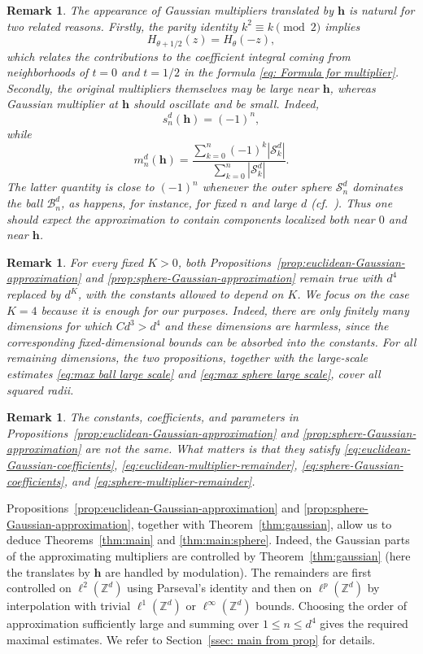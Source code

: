 \documentclass{article}
\newcommand{\Z}{\mathbb Z}
\theoremstyle{plain}
\newtheorem{remark}[theorem]{Remark}
\numberwithin{equation}{section}
\begin{document}
\begin{remark}
   The appearance of Gaussian multipliers translated by
$\mathbf h$
is natural for two related reasons. Firstly, the parity identity $k^2\equiv k \pmod 2$
implies
\[
H_{\theta+1/2}(z)=H_\theta(-z),
\]
which relates the contributions to the coefficient integral coming from
neighborhoods of $t=0$ and $t=1/2$ in the formula \eqref{eq: Formula for multiplier}.
Secondly, the original multipliers themselves may be large near $\mathbf h$, whereas Gaussian multiplier at $\mathbf h$ should oscillate and be small.
Indeed,
\[
s_n^d(\mathbf h)=(-1)^n,
\]
while
\[
m_n^d(\mathbf h)
=
\frac{\displaystyle\sum_{k=0}^n(-1)^k|\mathcal S_k^d|}
{\displaystyle\sum_{k=0}^n|\mathcal S_k^d|}.
\]
The latter quantity is close to $(-1)^n$ whenever the outer sphere
$\mathcal S_n^d$ dominates the ball $\mathcal B_n^d$, as happens, for
instance, for fixed $n$ and large $d$ (cf.\ \cite{NiksinskiWrobel}). Thus one should expect the
approximation to contain components localized both near $0$ and near
$\mathbf h$. 
\end{remark}
\begin{remark}
For every fixed $K>0$, both Propositions~\ref{prop:euclidean-Gaussian-approximation} and \ref{prop:sphere-Gaussian-approximation} remain true with $d^4$ replaced by $d^K$, with the constants allowed to depend on $K$. We focus on the case $K=4$ because it is enough for our purposes. Indeed, there are only finitely many dimensions for which $Cd^3>d^4$ and these dimensions are harmless, since the corresponding fixed-dimensional bounds can be absorbed into the constants. For all remaining dimensions, the two propositions, together with the large-scale estimates \eqref{eq:max ball large scale} and \eqref{eq:max sphere large scale}, cover all squared radii.
\end{remark}
\begin{remark}
The constants, coefficients, and parameters in Propositions~\ref{prop:euclidean-Gaussian-approximation} and \ref{prop:sphere-Gaussian-approximation} are not the same. What matters is that they satisfy \eqref{eq:euclidean-Gaussian-coefficients}, \eqref{eq:euclidean-multiplier-remainder}, \eqref{eq:sphere-Gaussian-coefficients}, and \eqref{eq:sphere-multiplier-remainder}.
\end{remark}

Propositions~\ref{prop:euclidean-Gaussian-approximation} and
\ref{prop:sphere-Gaussian-approximation}, together with
Theorem~\ref{thm:gaussian}, allow us to deduce
Theorems~\ref{thm:main} and \ref{thm:main:sphere}. Indeed, the Gaussian
parts of the approximating multipliers are controlled by
Theorem~\ref{thm:gaussian} (here the translates by $\mathbf h$ are handled
by modulation). The remainders are first controlled on $\ell^2(\Z^d)$
using Parseval's identity and then on $\ell^p(\Z^d)$ by interpolation
with trivial $\ell^1(\Z^d)$ or $\ell^\infty(\Z^d)$ bounds. Choosing the
order of approximation sufficiently large and summing over
$1\leq n\leq d^4$ gives the required maximal estimates. We refer to
Section~\ref{ssec: main from prop} for details.
\end{document}
